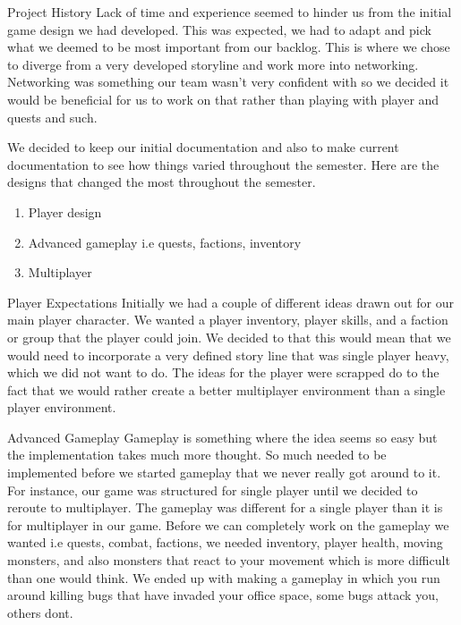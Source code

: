\documentclass[12pt]{report}
\begin{document}
\begin{chapter}{Project History}
	Lack of time and experience seemed to hinder us from the initial game design we had developed.  
	This was expected, we had to adapt and pick what we deemed to be most important from our backlog.  
	This is where we chose to diverge from a very developed storyline and work more into networking.  
	Networking was something our team wasn't very confident with so we decided it would be beneficial for us to work on that rather than playing with player and quests and such.
	
	We decided to keep our initial documentation and also to make current documentation to see how things varied throughout the semester.  
	Here are the designs that changed the most throughout the semester.
	
	\begin{enumerate}
		\item Player design
		\item Advanced gameplay i.e quests, factions, inventory
		\item Multiplayer
	\end{enumerate}
	
	\begin{subsection}{Player Expectations}
		Initially we had a couple of different ideas drawn out for our main player character.  
		We wanted a player inventory, player skills, and a faction or group that the player could join.  
		We decided to that this would mean that we would need to incorporate a very defined story line that was single player heavy, 
		which we did not want to do. The ideas for the player were scrapped do to the fact that we would rather create a better 
		multiplayer environment than a single player environment.
	\end{subsection}
	
	\begin{subsection}{Advanced Gameplay}
		Gameplay is something where the idea seems so easy but the implementation 
		takes much more thought.  So much needed to be implemented before we started gameplay 
		that we never really got around to it.  For instance, our game was structured for single player 
		until we decided to reroute to multiplayer.  The gameplay was different for a single 
		player than it is for multiplayer in our game.  Before we can completely work on the 
		gameplay we wanted i.e quests, combat, factions, we needed inventory, player health, moving monsters,
		and also monsters that react to your movement which is more difficult than one would think. 
		We ended up with making a gameplay in which you run around killing bugs that have invaded your office
		space, some bugs attack you, others dont. 
	\end{subsection}
	

\end{chapter}
\end{document}
